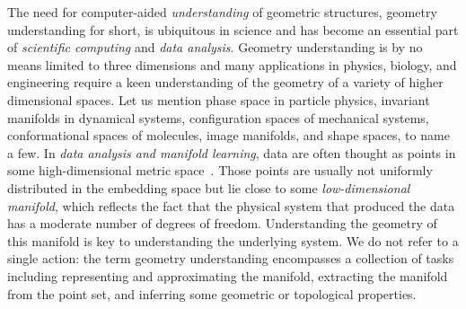 The need for computer-aided {\em understanding} of geometric structures, geometry understanding for short, is ubiquitous in science and has become an essential part of {\em scientific computing} and {\em data analysis}. Geometry understanding is by no means limited to three dimensions and many applications in physics, biology, and engineering require a keen understanding of the geometry of a variety of higher dimensional spaces. Let us mention phase space in particle physics, invariant manifolds in dynamical systems, configuration spaces of mechanical systems, conformational spaces of molecules, image manifolds, and shape spaces, to name a few. In {\em data analysis and manifold learning}, data are often thought as points in some high-dimensional metric space~\cite{dld-hdda-2000}. Those points are usually not uniformly distributed in the embedding space but lie close to some {\em low-dimensional manifold}, which reflects the fact that the physical system that produced the data has a moderate number of degrees of freedom.  Understanding the geometry of this manifold is key to understanding the underlying system. We do not refer to a single action: the term geometry understanding encompasses a collection of tasks including representing and approximating the manifold, extracting the manifold from the point set, and inferring some geometric or topological properties.


